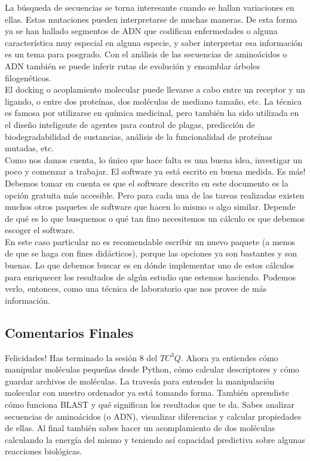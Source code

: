 \documentclass[10pt,letterpaper]{article}
\begin{document}
La b\'usqueda de secuencias se torna interesante cuando se hallan variaciones en ellas. Estas mutaciones pueden interpretarse de muchas maneras. De esta forma ya se han hallado segmentos de ADN que codifican enfermedades o alguna caracter\'istica muy especial en alguna especie, y saber interpretar esa informaci\'on es un tema para posgrado. Con el an\'alisis de las secuencias de amino\'acidos o ADN tambi\'en se puede inferir rutas de evoluci\'on y ensamblar \'arboles filogen\'eticos.\\

El docking o acoplamiento molecular puede llevarse a cabo entre un receptor y un ligando, o entre dos prote\'inas, dos mol\'eculas de mediano tama\~no, etc. La t\'ecnica es famosa por utilizarse en qu\'imica medicinal, pero tambi\'en ha sido utilizada en el dise\~no inteligente de agentes para control de plagas, predicci\'on de biodegradabilidad de sustancias, an\'alisis de la funcionalidad de prote\'inas mutadas, etc.\\

Como nos damos cuenta, lo \'unico que hace falta es una buena idea, investigar un poco y comenzar a trabajar. El software ya est\'a escrito en buena medida. Es m\'as! Debemos tomar en cuenta es que el software descrito en este documento es la opci\'on gratuita m\'as accesible. Pero para cada una de las tareas realizadas existen muchos otros paquetes de software que hacen lo mismo o algo similar. Depende de qu\'e es lo que busquemos o qu\'e tan fino necesitemos un c\'alculo es que debemos escoger el software.\\

En este caso particular no es recomendable escribir un nuevo paquete (a menos de que se haga con fines did\'acticos), porque las opciones ya son bastantes y son buenas. Lo que debemos buscar es en d\'onde implementar uno de estos c\'alculos para enriquecer los resultados de alg\'un estudio que estemos haciendo. Podemos verlo, entonces, como una t\'ecnica de laboratorio que nos provee de m\'as informaci\'on.

\subsection{Comentarios Finales}

Felicidades! Has terminado la sesi\'on 8 del $TC^3 Q$. Ahora ya entiendes c\'omo manipular mol\'eculas peque\~nas desde Python, c\'omo calcular descriptores y c\'omo guardar archivos de mol\'eculas. La traves\'ia para entender la manipulaci\'on molecular con nuestro ordenador ya est\'a tomando forma. Tambi\'en aprendiste c\'omo funciona BLAST y qu\'e significan los resultados que te da. Sabes analizar secuencias de amino\'acidos (o ADN), visualizar diferencias y calcular propiedades de ellas. Al final tambi\'en sabes hacer un acomplamiento de dos mol\'eculas calculando la energ\'ia del mismo y teniendo as\'i capacidad predictiva sobre algunas reacciones biol\'ogicas.\\
\end{document}
